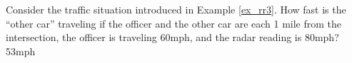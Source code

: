 {Consider the traffic situation introduced in Example \ref{ex_rr3}. How fast is the ``other car'' traveling if the officer and the other car are each 1 mile from the intersection, the officer is traveling 60mph, and the radar reading is 80mph?
}
{53mph
}

